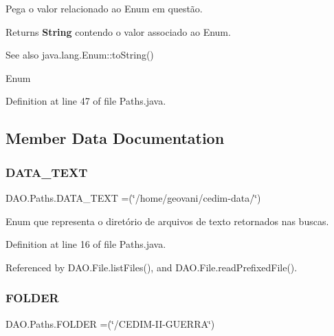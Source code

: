 Pega o valor relacionado ao Enum em questão.

\begin{DoxyReturn}{Returns}
{\bfseries String} contendo o valor associado ao Enum.
\end{DoxyReturn}
\begin{DoxySeeAlso}{See also}
java.\+lang.\+Enum\+::to\+String() 

Enum 
\end{DoxySeeAlso}


Definition at line 47 of file Paths.\+java.



\subsection{Member Data Documentation}
\hypertarget{enumDAO_1_1Paths_ab64a399f7d835455b9cf0b1207192eb0}{}\label{enumDAO_1_1Paths_ab64a399f7d835455b9cf0b1207192eb0} 
\subsubsection{\texorpdfstring{D\+A\+T\+A\+\_\+\+T\+E\+XT}{DATA\_TEXT}}
{\footnotesize\ttfamily D\+A\+O.\+Paths.\+D\+A\+T\+A\+\_\+\+T\+E\+XT =(\char`\"{}/home/geovani/cedim-\/data/\char`\"{})}

Enum que representa o diretório de arquivos de texto retornados nas buscas. 

Definition at line 16 of file Paths.\+java.



Referenced by D\+A\+O.\+File.\+list\+Files(), and D\+A\+O.\+File.\+read\+Prefixed\+File().

\hypertarget{enumDAO_1_1Paths_a59211c627b8e37937625d10bcfab4899}{}\label{enumDAO_1_1Paths_a59211c627b8e37937625d10bcfab4899} 
\subsubsection{\texorpdfstring{F\+O\+L\+D\+ER}{FOLDER}}
{\footnotesize\ttfamily D\+A\+O.\+Paths.\+F\+O\+L\+D\+ER =(\char`\"{}/C\+E\+D\+IM-\/II-\/G\+U\+E\+R\+RA\char`\"{})}

